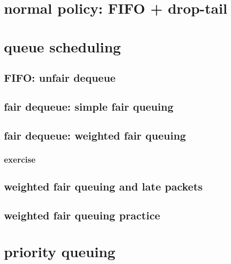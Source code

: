 \section{normal policy: FIFO + drop-tail}


\section{queue scheduling}


\subsection{FIFO: unfair dequeue} 


\subsection{fair dequeue: simple fair queuing}





\subsection{fair dequeue: weighted fair queuing}



\subsubsection{exercise}


\subsection{weighted fair queuing and late packets}


\subsection{weighted fair queuing practice}


\section{priority queuing}


